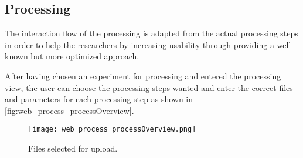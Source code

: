 \subsection{Processing}
The interaction flow of the processing is adapted from the actual processing 
steps in order to help the researchers by increasing usability through providing
a well-known but more optimized approach.

After having chosen an experiment for processing and entered the processing 
view, the user can choose the processing steps wanted and enter the correct
files and parameters for each processing step as shown in 
\autoref{fig:web_process_processOverview}.

\begin{figure}[h]
    \centering
    \texttt{[image: web\_process\_processOverview.png]}
    \caption{Files selected for upload.}
    \label{fig:web_process_processOverview}
\end{figure}

